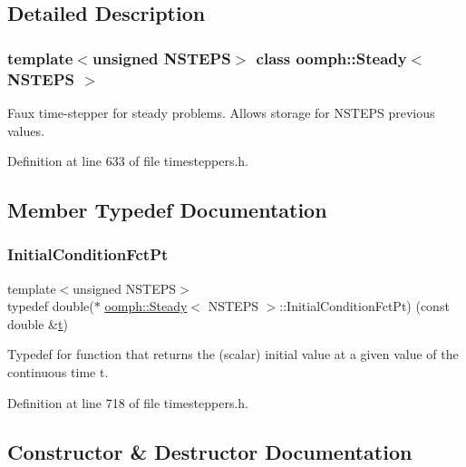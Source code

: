 \subsection{Detailed Description}
\subsubsection*{template$<$unsigned N\+S\+T\+E\+PS$>$\newline
class oomph\+::\+Steady$<$ N\+S\+T\+E\+P\+S $>$}

Faux time-\/stepper for steady problems. Allows storage for N\+S\+T\+E\+PS previous values. 

Definition at line 633 of file timesteppers.\+h.



\subsection{Member Typedef Documentation}
\mbox{\label{classoomph_1_1Steady_a107849d71562b3efa4bf785de60490b3}} 
\subsubsection{\texorpdfstring{Initial\+Condition\+Fct\+Pt}{InitialConditionFctPt}}
{\footnotesize\ttfamily template$<$unsigned N\+S\+T\+E\+PS$>$ \\
typedef double($\ast$ \hyperlink{classoomph_1_1Steady}{oomph\+::\+Steady}$<$ N\+S\+T\+E\+PS $>$\+::Initial\+Condition\+Fct\+Pt) (const double \&\hyperlink{cfortran_8h_af6f0bd3dc13317f895c91323c25c2b8f}{t})}



Typedef for function that returns the (scalar) initial value at a given value of the continuous time t. 



Definition at line 718 of file timesteppers.\+h.



\subsection{Constructor \& Destructor Documentation}
\mbox{\label{classoomph_1_1Steady_a7e6510bdcdb448db8e4f975edd72bdaf}} 
